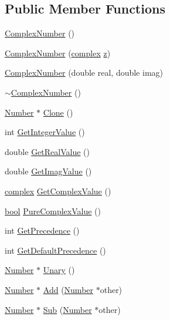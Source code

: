 \subsection*{Public Member Functions}
\begin{DoxyCompactItemize}
\item 
\hyperlink{structComplexNumber_a610e9db9ff0ddb0140e30d235ab64e44}{Complex\+Number} ()
\item 
\hyperlink{structComplexNumber_a0d89581ead93385331befcef51698693}{Complex\+Number} (\hyperlink{unioncomplex}{complex} \hyperlink{structComplexNumber_a5f72da71f4ce0d88076a391369239042}{z})
\item 
\hyperlink{structComplexNumber_af0a78be5e675c845b8dc2bf8e5e8f32b}{Complex\+Number} (double real, double imag)
\item 
\hyperlink{structComplexNumber_abc3b759a61e4964ccd712622ce00e0d1}{$\sim$\+Complex\+Number} ()
\item 
\hyperlink{structNumber}{Number} $\ast$ \hyperlink{structComplexNumber_acae8fd1b1c3cd871b9975053b9bcc4d1}{Clone} ()
\item 
int \hyperlink{structComplexNumber_a5d9fb1157a99a97244b306821b1d30c1}{Get\+Integer\+Value} ()
\item 
double \hyperlink{structComplexNumber_ae9f6a3f46c067286dec298358dee3cd7}{Get\+Real\+Value} ()
\item 
double \hyperlink{structComplexNumber_a4b26887c940f046a442815ac154cda66}{Get\+Imag\+Value} ()
\item 
\hyperlink{unioncomplex}{complex} \hyperlink{structComplexNumber_a711b2ce78037a97680c46a5e1e9a4bb8}{Get\+Complex\+Value} ()
\item 
\hyperlink{platform_8h_a1062901a7428fdd9c7f180f5e01ea056}{bool} \hyperlink{structComplexNumber_a5343b272e85da4ea67a5b8aaa53fdac0}{Pure\+Complex\+Value} ()
\item 
int \hyperlink{structComplexNumber_a14e7e0bfb5fe65d667c9ff50634cfdf6}{Get\+Precedence} ()
\item 
int \hyperlink{structComplexNumber_a703a1afdc3223e5cdacff225903e62ef}{Get\+Default\+Precedence} ()
\item 
\hyperlink{structNumber}{Number} $\ast$ \hyperlink{structComplexNumber_a52bb791f848e90072a65841c7402b2c4}{Unary} ()
\item 
\hyperlink{structNumber}{Number} $\ast$ \hyperlink{structComplexNumber_ad6b9fb6fe480c3a626f4e105024d2375}{Add} (\hyperlink{structNumber}{Number} $\ast$other)
\item 
\hyperlink{structNumber}{Number} $\ast$ \hyperlink{structComplexNumber_a8f196f990620e30495f69338a1e40316}{Sub} (\hyperlink{structNumber}{Number} $\ast$other)

\end{DoxyCompactItemize}
